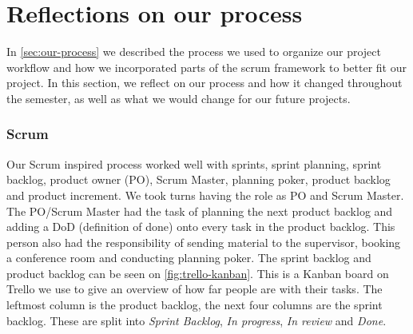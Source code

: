 \section{Reflections on our process}
In \autoref{sec:our-process} we described the process we used to organize our project workflow and how we incorporated parts of the scrum framework to better fit our project.
In this section, we reflect on our process and how it changed throughout the semester, as well as what we would change for our future projects.

\subsubsection{Scrum}
Our Scrum inspired process worked well with sprints, sprint planning, sprint backlog, product owner (PO), Scrum Master, planning poker, product backlog and product increment.
We took turns having the role as PO and Scrum Master.
The PO/Scrum Master had the task of planning the next product backlog and adding a DoD (definition of done) onto every task in the product backlog.
This person also had the responsibility of sending material to the supervisor, booking a conference room and conducting planning poker.
The sprint backlog and product backlog can be seen on \autoref{fig:trello-kanban}. 
This is a Kanban board on Trello we use to give an overview of how far people are with their tasks.
The leftmost column is the product backlog, the next four columns are the sprint backlog.
These are split into \textit{Sprint Backlog}, \textit{In progress}, \textit{In review} and \textit{Done}.

